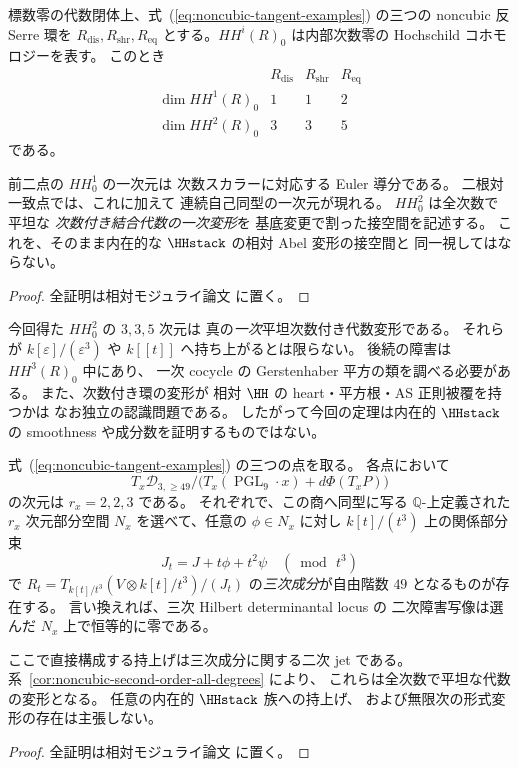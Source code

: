 \begin{theorem}
\label{thm:noncubic-hh01-hh2}
標数零の代数閉体上、式~(\ref{eq:noncubic-tangent-examples})
の三つの noncubic 反 Serre 環を
$R_{\mathrm{dis}},R_{\mathrm{shr}},R_{\mathrm{eq}}$
とする。$HH^i(R)_0$ は内部次数零の
Hochschild コホモロジーを表す。
このとき
\[
\begin{array}{c|ccc}
 &R_{\mathrm{dis}}&R_{\mathrm{shr}}&R_{\mathrm{eq}}\\ \hline
 \dim HH^1(R)_0 &1&1&2\\
 \dim HH^2(R)_0 &3&3&5
\end{array}
\tag{NC-HH}\label{eq:noncubic-hh-table}
\]
である。

前二点の $HH^1_0$ の一次元は
次数スカラーに対応する Euler 導分である。
二根対一致点では、これに加えて
連続自己同型の一次元が現れる。
$HH^2_0$ は全次数で平坦な
\emph{次数付き結合代数の一次変形}を
基底変更で割った接空間を記述する。
これを、そのまま内在的な
$\HHstack$ の相対 Abel 変形の接空間と
同一視してはならない。
\end{theorem}
\begin{proof}
全証明は相対モジュライ論文 \cite[\texttt{noncubic_stack}]{QuadricModuli2026} に置く。
\end{proof}

\begin{remark}[形式的な持上げと次数付き代数の局所模型]
今回得た $HH^2_0$ の $3,3,5$ 次元は
真の\emph{一次}平坦次数付き代数変形である。
それらが $k[\varepsilon]/(\varepsilon^3)$ や
$k[[t]]$ へ持ち上がるとは限らない。
後続の障害は $HH^3(R)_0$ 中にあり、
一次 cocycle の Gerstenhaber 平方の類を調べる必要がある。
また、次数付き環の変形が
相対 $\HH$ の heart・平方根・AS 正則被覆を持つかは
なお独立の認識問題である。
したがって今回の定理は内在的 $\HHstack$
の smoothness や成分数を証明するものではない。
\end{remark}

\begin{proposition}
\label{prop:noncubic-transverse-second-order}
式~(\ref{eq:noncubic-tangent-examples}) の三つの点を取る。
各点において
\[
 T_x\mathcal D_{3,\ge49}
 \big/
 \bigl(T_x(\operatorname{PGL}_9\cdot x)
     +d\Phi(T_xP)\bigr)
\]
の次元は $r_x=2,2,3$ である。
それぞれで、この商へ同型に写る
$\mathbb Q$-上定義された $r_x$ 次元部分空間 $N_x$
を選べて、任意の $\phi\in N_x$ に対し
$k[t]/(t^3)$ 上の関係部分束
\[
 J_t=J+t\phi+t^2\psi
 \quad(\bmod\,t^3)
\]
で $R_t=T_{k[t]/t^3}(V\otimes k[t]/t^3)/(J_t)$
の\emph{三次成分}が自由階数 $49$ となるものが存在する。
言い換えれば、三次 Hilbert determinantal locus の
二次障害写像は選んだ $N_x$ 上で恒等的に零である。

ここで直接構成する持上げは三次成分に関する二次 jet である。
系~\ref{cor:noncubic-second-order-all-degrees} により、
これらは全次数で平坦な代数の変形となる。
任意の内在的 $\HHstack$ 族への持上げ、
および無限次の形式変形の存在は主張しない。
\end{proposition}
\begin{proof}
全証明は相対モジュライ論文 \cite[\texttt{noncubic_stack}]{QuadricModuli2026} に置く。
\end{proof}

